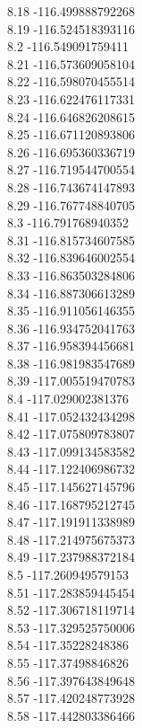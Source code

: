 {8.18	-116.499888792268\\
8.19	-116.524518393116\\
8.2	-116.549091759411\\
8.21	-116.573609058104\\
8.22	-116.598070455514\\
8.23	-116.622476117331\\
8.24	-116.646826208615\\
8.25	-116.671120893806\\
8.26	-116.695360336719\\
8.27	-116.719544700554\\
8.28	-116.743674147893\\
8.29	-116.767748840705\\
8.3	-116.791768940352\\
8.31	-116.815734607585\\
8.32	-116.839646002554\\
8.33	-116.863503284806\\
8.34	-116.887306613289\\
8.35	-116.911056146355\\
8.36	-116.934752041763\\
8.37	-116.958394456681\\
8.38	-116.981983547689\\
8.39	-117.005519470783\\
8.4	-117.029002381376\\
8.41	-117.052432434298\\
8.42	-117.075809783807\\
8.43	-117.099134583582\\
8.44	-117.122406986732\\
8.45	-117.145627145796\\
8.46	-117.168795212745\\
8.47	-117.191911338989\\
8.48	-117.214975675373\\
8.49	-117.237988372184\\
8.5	-117.260949579153\\
8.51	-117.283859445454\\
8.52	-117.306718119714\\
8.53	-117.329525750006\\
8.54	-117.35228248386\\
8.55	-117.37498846826\\
8.56	-117.397643849648\\
8.57	-117.420248773928\\
8.58	-117.442803386466\\
}
